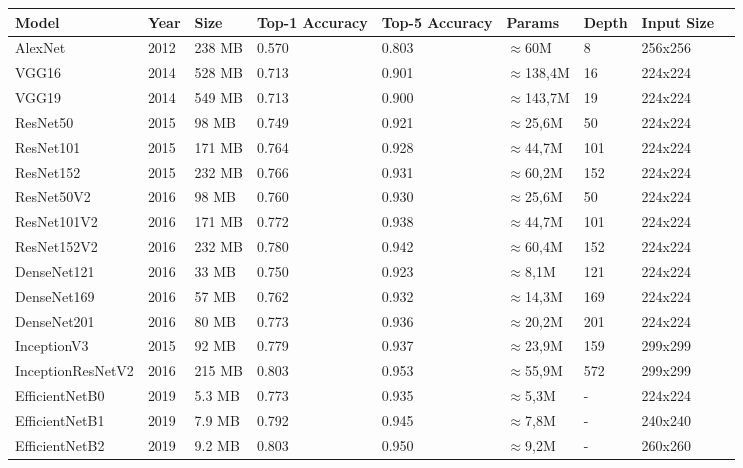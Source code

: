     \begin{table}[h]
        \centering
        \begin{tabularx}{\textwidth}{|l|X|X|X|X|X|X|X|X|}
            \hline
            Model & Year & Size & Top-1 Accuracy & Top-5 Accuracy & Params & Depth & Input Size \\ \hline
            AlexNet & 2012 & 238 MB & 0.570 & 0.803 & $\approx$60M & 8 & 256x256 \\ \hline
        	VGG16 & 2014 & 528 MB & 0.713 & 0.901 & $\approx$138,4M & 16 & 224x224 \\ \hline
        	VGG19 & 2014 & 549 MB & 0.713 & 0.900 & $\approx$143,7M & 19 & 224x224 \\ \hline
        	ResNet50 & 2015 & 98 MB & 0.749 & 0.921 & $\approx$25,6M & 50 & 224x224 \\ \hline
        	ResNet101 & 2015 & 171 MB & 0.764 & 0.928 & $\approx$44,7M & 101 & 224x224 \\ \hline
        	ResNet152 & 2015 & 232 MB & 0.766 & 0.931 & $\approx$60,2M & 152 & 224x224 \\ \hline
        	ResNet50V2 & 2016 & 98 MB & 0.760 & 0.930 & $\approx$25,6M & 50 & 224x224 \\ \hline
        	ResNet101V2 & 2016 & 171 MB & 0.772 & 0.938 & $\approx$44,7M & 101 & 224x224 \\ \hline
        	ResNet152V2 & 2016 & 232 MB & 0.780 & 0.942 & $\approx$60,4M & 152 & 224x224 \\ \hline
            DenseNet121 & 2016 & 33 MB & 0.750 & 0.923 & $\approx$8,1M & 121 & 224x224 \\ \hline
        	DenseNet169 & 2016 & 57 MB & 0.762 & 0.932 & $\approx$14,3M & 169 & 224x224 \\ \hline
        	DenseNet201 & 2016 & 80 MB & 0.773 & 0.936 & $\approx$20,2M & 201 & 224x224 \\ \hline
        	InceptionV3 & 2015 & 92 MB & 0.779 & 0.937 & $\approx$23,9M & 159 & 299x299 \\ \hline
        	InceptionResNetV2 & 2016 & 215 MB & 0.803 & 0.953 & $\approx$55,9M & 572 & 299x299 \\ \hline
        	EfficientNetB0 & 2019 & 5.3 MB & 0.773 & 0.935 & $\approx$5,3M & - & 224x224 \\ \hline
        	EfficientNetB1 & 2019 & 7.9 MB & 0.792 & 0.945 & $\approx$7,8M & - & 240x240 \\ \hline
        	EfficientNetB2 & 2019 & 9.2 MB & 0.803 & 0.950 & $\approx$9,2M & - & 260x260 \\ \hline

\end{tabularx}
\end{table}
